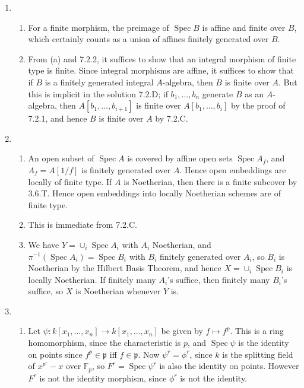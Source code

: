 \documentclass{report}
\newcommand{\p}{\mathfrak{p}}
\newcommand{\F}{\mathbb{F}}
\DeclareMathOperator{\Spec}{Spec}
\begin{document}
\begin{enumerate}[label=\textbf{7.3.\Alph*.}]
	\item
	      \begin{enumerate}[label=(\alph*)]
		      \item For a finite morphism, the preimage of $\Spec B$ is affine
		            and finite over $B$, which certainly counts as a union of
		            affines finitely generated over $B$.

		      \item From (a) and 7.2.2, it suffices to show that an integral
		            morphism of finite type is finite. Since integral morphisms
		            are affine, it suffices to show that if $B$ is a finitely
		            generated integral $A$-algebra, then $B$ is finite over $A$.
		            But this is implicit in the solution 7.2.D; if
		            $b_1,\ldots,b_n$ generate $B$ as an $A$-algebra, then
		            $A[b_1,\ldots,b_{i+1}]$ is finite over $A[b_1,\ldots,b_i]$ by
		            the proof of 7.2.1, and hence $B$ is finite over $A$ by 7.2.C.
	      \end{enumerate}

	\item
	      \begin{enumerate}[label=(\alph*)]
		      \item An open subset of $\Spec A$ is covered by affine open sets
		            $\Spec A_f$, and $A_f=A[1/f]$ is finitely generated over $A$.
		            Hence open embeddings are locally of finite type. If $A$ is
		            Noetherian, then there is a finite subcover by 3.6.T. Hence
		            open embeddings into locally Noetherian schemes are of finite
		            type.

		      \item This is immediate from 7.2.C.

		      \item We have $Y=\cup_i\Spec A_i$ with $A_i$ Noetherian, and
		            $\pi^{-1}(\Spec A_i)=\Spec B_i$ with $B_i$ finitely generated
		            over $A_i$, so $B_i$ is Noetherian by the Hilbert Basis
		            Theorem, and hence $X=\cup_i\Spec B_i$ is locally Noetherian.
		            If finitely many $A_i$'s suffice, then finitely many $B_i$'s
		            suffice, so $X$ is Noetherian whenever $Y$ is.
	      \end{enumerate}

	\item
	      \begin{enumerate}[label=(\alph*)]
		      \item Let $\psi:k[x_1,\ldots,x_n]\to k[x_1,\ldots,x_n]$ be given
		            by $f\mapsto f^p$. This is a ring homomorphism, since the
		            characteristic is $p$, and $\Spec\psi$ is the identity on
		            points since $f^p\in\p$ iff $f\in\p$. Now $\psi^r=\phi^r$,
		            since $k$ is the splitting field of $x^{p^r}-x$ over $\F_p$,
		            so $F^r=\Spec\psi^r$ is also the identity on points. However
		            $F^r$ is not the identity morphism, since $\phi^r$ is not the
		            identity.


\end{enumerate}
\end{enumerate}
\end{document}
